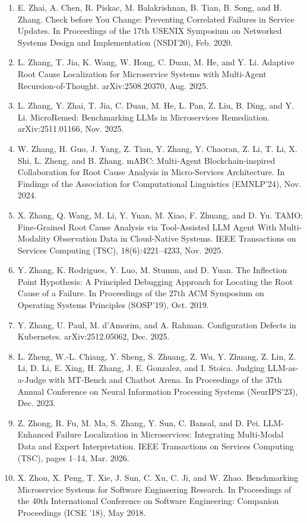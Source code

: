 \documentclass[11pt,UTF8,fontset=fandol]{ctexart}
\begin{document}
\begin{enumerate}[leftmargin=2.2em,labelsep=0.4em,itemsep=0.15em]
\item E. Zhai, A. Chen, R. Piskac, M. Balakrishnan, B. Tian, B. Song, and H. Zhang. Check before You Change: Preventing Correlated Failures in Service Updates. In Proceedings of the 17th USENIX Symposium on Networked Systems Design and Implementation (NSDI'20), Feb. 2020.
\item L. Zhang, T. Jia, K. Wang, W. Hong, C. Duan, M. He, and Y. Li. Adaptive Root Cause Localization for Microservice Systems with Multi-Agent Recursion-of-Thought. arXiv:2508.20370, Aug. 2025.
\item L. Zhang, Y. Zhai, T. Jia, C. Duan, M. He, L. Pan, Z. Liu, B. Ding, and Y. Li. MicroRemed: Benchmarking LLMs in Microservices Remediation. arXiv:2511.01166, Nov. 2025.
\item W. Zhang, H. Guo, J. Yang, Z. Tian, Y. Zhang, Y. Chaoran, Z. Li, T. Li, X. Shi, L. Zheng, and B. Zhang. mABC: Multi-Agent Blockchain-inspired Collaboration for Root Cause Analysis in Micro-Services Architecture. In Findings of the Association for Computational Linguistics (EMNLP'24), Nov. 2024.
\item X. Zhang, Q. Wang, M. Li, Y. Yuan, M. Xiao, F. Zhuang, and D. Yu. TAMO: Fine-Grained Root Cause Analysis via Tool-Assisted LLM Agent With Multi-Modality Observation Data in Cloud-Native Systems. IEEE Transactions on Services Computing (TSC), 18(6):4221--4233, Nov. 2025.
\item Y. Zhang, K. Rodrigues, Y. Luo, M. Stumm, and D. Yuan. The Inflection Point Hypothesis: A Principled Debugging Approach for Locating the Root Cause of a Failure. In Proceedings of the 27th ACM Symposium on Operating Systems Principles (SOSP'19), Oct. 2019.
\item Y. Zhang, U. Paul, M. d'Amorim, and A. Rahman. Configuration Defects in Kubernetes. arXiv:2512.05062, Dec. 2025.
\item L. Zheng, W.-L. Chiang, Y. Sheng, S. Zhuang, Z. Wu, Y. Zhuang, Z. Lin, Z. Li, D. Li, E. Xing, H. Zhang, J. E. Gonzalez, and I. Stoica. Judging LLM-as-a-Judge with MT-Bench and Chatbot Arena. In Proceedings of the 37th Annual Conference on Neural Information Processing Systems (NeurIPS'23), Dec. 2023.
\item Z. Zhong, R. Fu, M. Ma, S. Zhang, Y. Sun, C. Bansal, and D. Pei. LLM-Enhanced Failure Localization in Microservices: Integrating Multi-Modal Data and Expert Interpretation. IEEE Transactions on Services Computing (TSC), pages 1--14, Mar. 2026.
\item X. Zhou, X. Peng, T. Xie, J. Sun, C. Xu, C. Ji, and W. Zhao. Benchmarking Microservice Systems for Software Engineering Research. In Proceedings of the 40th International Conference on Software Engineering: Companion Proceedings (ICSE '18), May 2018.

\end{enumerate}
\end{document}
